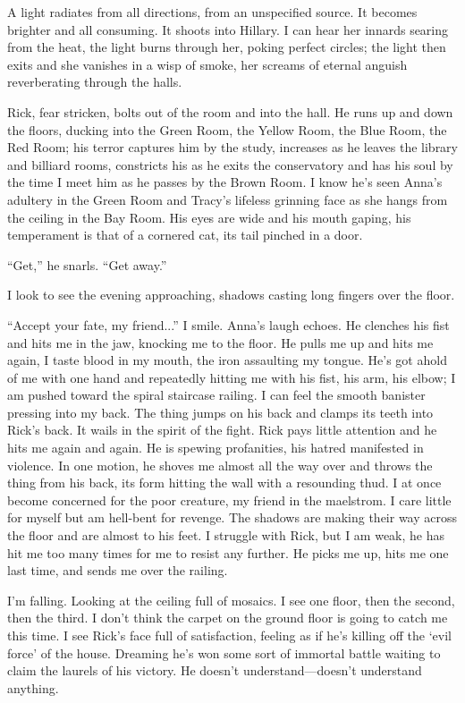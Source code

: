 A light radiates from all directions, from an unspecified source. It
becomes brighter and all consuming. It shoots into Hillary. I can hear
her innards searing from the heat, the light burns through her, poking
perfect circles; the light then exits and she vanishes in a wisp of
smoke, her screams of eternal anguish reverberating through the halls.

Rick, fear stricken, bolts out of the room and into the hall. He runs up
and down the floors, ducking into the Green Room, the Yellow Room, the
Blue Room, the Red Room; his terror captures him by the study, increases
as he leaves the library and billiard rooms, constricts his as he exits
the conservatory and has his soul by the time I meet him as he passes by
the Brown Room. I know he's seen Anna's adultery in the Green Room and
Tracy's lifeless grinning face as she hangs from the ceiling in the Bay
Room. His eyes are wide and his mouth gaping, his temperament is that of
a cornered cat, its tail pinched in a door.

``Get,'' he snarls. ``Get away.''

I look to see the evening approaching, shadows casting long fingers over
the floor.

``Accept your fate, my friend...'' I smile. Anna's laugh echoes. He
clenches his fist and hits me in the jaw, knocking me to the floor. He
pulls me up and hits me again, I taste blood in my mouth, the iron
assaulting my tongue. He's got ahold of me with one hand and repeatedly
hitting me with his fist, his arm, his elbow; I am pushed toward the
spiral staircase railing. I can feel the smooth banister pressing into
my back. The thing jumps on his back and clamps its teeth into Rick's
back. It wails in the spirit of the fight. Rick pays little attention
and he hits me again and again. He is spewing profanities, his hatred
manifested in violence. In one motion, he shoves me almost all the way
over and throws the thing from his back, its form hitting the wall with
a resounding thud. I at once become concerned for the poor creature, my
friend in the maelstrom. I care little for myself but am hell-bent for
revenge. The shadows are making their way across the floor and are
almost to his feet. I struggle with Rick, but I am weak, he has hit me
too many times for me to resist any further. He picks me up, hits me one
last time, and sends me over the railing.

I'm falling. Looking at the ceiling full of mosaics. I see one floor,
then the second, then the third. I don't think the carpet on the ground
floor is going to catch me this time. I see Rick's face full of
satisfaction, feeling as if he's killing off the `evil force' of the
house. Dreaming he's won some sort of immortal battle waiting to claim
the laurels of his victory. He doesn't understand---doesn't understand
anything.

